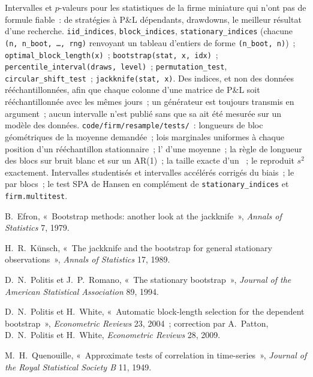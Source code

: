 \begin{build}
 Intervalles et $p$-valeurs pour les statistiques de la firme miniature qui n'ont pas de formule fiable~:  de
stratégies à P\&L dépendants, drawdowns, le meilleur résultat d'une recherche.
 \texttt{iid\_indices}, \texttt{block\_indices}, \texttt{stationary\_indices} (chacune \texttt{(n, n\_boot, \dots, rng)}
renvoyant un tableau d'entiers de forme \texttt{(n\_boot, n)})~; \texttt{optimal\_block\_length(x)}~; \texttt{bootstrap(stat, x, idx)}~;
\texttt{percentile\_interval(draws, level)}~; \texttt{permutation\_test}, \texttt{circular\_shift\_test}~; \texttt{jackknife(stat, x)}.
 Des indices, et non des données rééchantillonnées, afin que chaque colonne d'une matrice de P\&L soit rééchantillonnée avec les mêmes jours~; un générateur est toujours
transmis en argument~; aucun intervalle n'est publié sans que sa  ait été mesurée sur un modèle des données.
 \texttt{code/firm/resample/tests/}~: longueurs de bloc géométriques de la moyenne demandée~; lois marginales uniformes à chaque
position d'un rééchantillon stationnaire~; l'  d'une moyenne~; la règle de longueur des blocs sur bruit blanc et sur un AR(1)~; la
taille exacte d'un ~; le  reproduit $s^2$ exactement.
 Intervalles studentisés et intervalles accélérés corrigés du biais~; le  par blocs~; le test SPA de Hansen en complément de
\texttt{stationary\_indices} et \texttt{firm.multitest}.
\end{build}

\begin{omsources}
\item B.~Efron, «~Bootstrap methods: another look at the jackknife~», \emph{Annals of Statistics} 7, 1979.
\item H.~R.~Künsch, «~The jackknife and the bootstrap for general stationary observations~», \emph{Annals of Statistics} 17, 1989.
\item D.~N.~Politis et J.~P.~Romano, «~The stationary bootstrap~», \emph{Journal of the American Statistical Association} 89, 1994.
\item D.~N.~Politis et H.~White, «~Automatic block-length selection for the dependent bootstrap~», \emph{Econometric Reviews} 23, 2004~;
correction par A.~Patton, D.~N.~Politis et H.~White, \emph{Econometric Reviews} 28, 2009.
\item M.~H.~Quenouille, «~Approximate tests of correlation in time-series~», \emph{Journal of the Royal Statistical Society B} 11, 1949.
\end{omsources}

